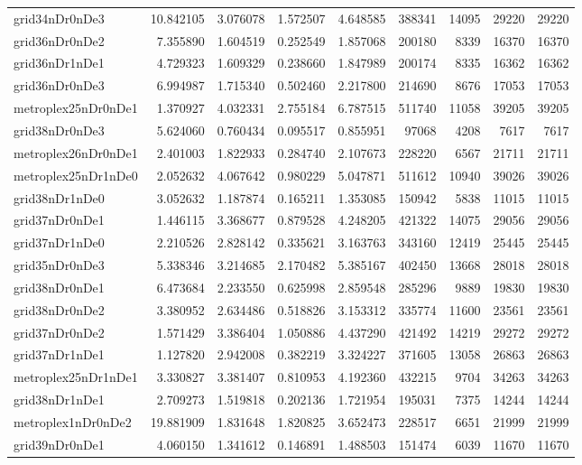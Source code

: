 \documentclass[../../../thesis.tex]{subfiles}
\begin{document}
\begin{longtable}{|l|r|r|r|r|r|r|r|r|}
grid34nDr0nDe3 & 10.842105 & 3.076078 & 1.572507 & 4.648585 & 388341 & 14095 & 29220 & 29220 \\
grid36nDr0nDe2 & 7.355890 & 1.604519 & 0.252549 & 1.857068 & 200180 & 8339 & 16370 & 16370 \\
grid36nDr1nDe1 & 4.729323 & 1.609329 & 0.238660 & 1.847989 & 200174 & 8335 & 16362 & 16362 \\
grid36nDr0nDe3 & 6.994987 & 1.715340 & 0.502460 & 2.217800 & 214690 & 8676 & 17053 & 17053 \\
metroplex25nDr0nDe1 & 1.370927 & 4.032331 & 2.755184 & 6.787515 & 511740 & 11058 & 39205 & 39205 \\
grid38nDr0nDe3 & 5.624060 & 0.760434 & 0.095517 & 0.855951 & 97068 & 4208 & 7617 & 7617 \\
metroplex26nDr0nDe1 & 2.401003 & 1.822933 & 0.284740 & 2.107673 & 228220 & 6567 & 21711 & 21711 \\
metroplex25nDr1nDe0 & 2.052632 & 4.067642 & 0.980229 & 5.047871 & 511612 & 10940 & 39026 & 39026 \\
grid38nDr1nDe0 & 3.052632 & 1.187874 & 0.165211 & 1.353085 & 150942 & 5838 & 11015 & 11015 \\
grid37nDr0nDe1 & 1.446115 & 3.368677 & 0.879528 & 4.248205 & 421322 & 14075 & 29056 & 29056 \\
grid37nDr1nDe0 & 2.210526 & 2.828142 & 0.335621 & 3.163763 & 343160 & 12419 & 25445 & 25445 \\
grid35nDr0nDe3 & 5.338346 & 3.214685 & 2.170482 & 5.385167 & 402450 & 13668 & 28018 & 28018 \\
grid38nDr0nDe1 & 6.473684 & 2.233550 & 0.625998 & 2.859548 & 285296 & 9889 & 19830 & 19830 \\
grid38nDr0nDe2 & 3.380952 & 2.634486 & 0.518826 & 3.153312 & 335774 & 11600 & 23561 & 23561 \\
grid37nDr0nDe2 & 1.571429 & 3.386404 & 1.050886 & 4.437290 & 421492 & 14219 & 29272 & 29272 \\
grid37nDr1nDe1 & 1.127820 & 2.942008 & 0.382219 & 3.324227 & 371605 & 13058 & 26863 & 26863 \\
metroplex25nDr1nDe1 & 3.330827 & 3.381407 & 0.810953 & 4.192360 & 432215 & 9704 & 34263 & 34263 \\
grid38nDr1nDe1 & 2.709273 & 1.519818 & 0.202136 & 1.721954 & 195031 & 7375 & 14244 & 14244 \\
metroplex1nDr0nDe2 & 19.881909 & 1.831648 & 1.820825 & 3.652473 & 228517 & 6651 & 21999 & 21999 \\
grid39nDr0nDe1 & 4.060150 & 1.341612 & 0.146891 & 1.488503 & 151474 & 6039 & 11670 & 11670 \\

\end{longtable}
\end{document}
